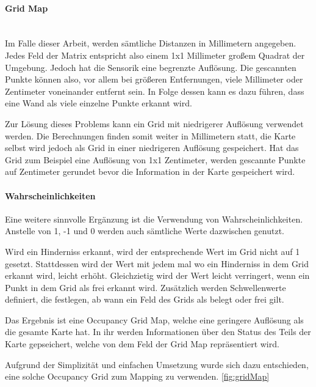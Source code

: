 \paragraph{Grid Map} \mbox{}\\
Im Falle dieser Arbeit, werden sämtliche Distanzen in Millimetern angegeben.
Jedes Feld der Matrix entspricht also einem 1x1 Millimeter großem Quadrat der Umgebung.
Jedoch hat die Sensorik eine begrenzte Auflösung.
Die gescannten Punkte können also, vor allem bei größeren Entfernungen, viele Millimeter oder Zentimeter voneinander entfernt sein.
In Folge dessen kann es dazu führen, dass eine Wand als viele einzelne Punkte erkannt wird.

Zur Lösung dieses Problems kann ein Grid mit niedrigerer Auflösung verwendet werden.
Die Berechnungen finden somit weiter in Millimetern statt, die Karte selbst wird jedoch als Grid in einer niedrigeren Auflösung gespeichert.
Hat das Grid zum Beispiel eine Auflösung von 1x1 Zentimeter, werden gescannte Punkte auf Zentimeter gerundet bevor die Information in der Karte gespeichert wird.

\paragraph{Wahrscheinlichkeiten}
Eine weitere sinnvolle Ergänzung ist die Verwendung von Wahrscheinlichkeiten.
Anstelle von 1, -1 und 0 werden auch sämtliche Werte dazwischen genutzt.

Wird ein Hinderniss erkannt, wird der entsprechende Wert im Grid nicht auf 1 gesetzt.
Stattdessen wird der Wert mit jedem mal wo ein Hinderniss in dem Grid erkannt wird, leicht erhöht.
Gleichzietig wird der Wert leicht verringert, wenn ein Punkt in dem Grid als frei erkannt wird.
Zusätzlich werden Schwellenwerte definiert, die festlegen, ab wann ein Feld des Grids als belegt oder frei gilt.

Das Ergebnis ist eine Occupancy Grid Map, welche eine geringere Auflösung als die gesamte Karte hat.
In ihr werden Informationen über den Status des Teils der Karte gepseichert, welche von dem Feld der Grid Map repräsentiert wird.

Aufgrund der Simplizität und einfachen Umsetzung wurde sich dazu entschieden, eine solche Occupancy Grid zum Mapping zu verwenden.
\ref{fig:gridMap}

